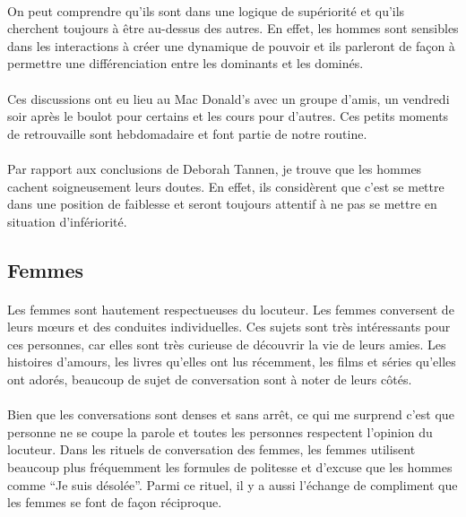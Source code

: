 \paragraph{} On peut comprendre qu'ils sont dans une logique de supériorité et
qu'ils cherchent toujours à être au-dessus des autres. En effet, les hommes
sont sensibles dans les interactions à créer une dynamique de pouvoir et ils
parleront de façon à permettre une différenciation entre les dominants et les
dominés.

\paragraph{} Ces discussions ont eu lieu au Mac Donald's avec un groupe d'amis,
un vendredi soir après le boulot pour certains et les cours pour d'autres. Ces
petits moments de retrouvaille sont hebdomadaire et font partie de notre
routine.

\paragraph{} Par rapport aux conclusions de Deborah Tannen, je trouve que les
hommes cachent soigneusement leurs doutes. En effet, ils considèrent que c'est
se mettre dans une position de faiblesse et seront toujours attentif à ne pas
se mettre en situation d'infériorité.

\subsection{Femmes}

\paragraph{} Les femmes sont hautement respectueuses du locuteur. Les femmes
conversent de leurs mœurs et des conduites individuelles.  Ces sujets sont
très intéressants pour ces personnes, car elles sont très curieuse de découvrir
la vie de leurs amies. Les histoires d'amours, les livres qu'elles ont lus
récemment, les films et séries qu'elles ont adorés, beaucoup de sujet de
conversation sont à noter de leurs côtés.

\paragraph{} Bien que les conversations sont denses et sans arrêt, ce qui me
surprend c'est que personne ne se coupe la parole et toutes les personnes
respectent l'opinion du locuteur. Dans les rituels de conversation des femmes,
les femmes utilisent beaucoup plus fréquemment les formules de politesse et
d'excuse que les hommes comme ``Je suis désolée''. Parmi ce rituel, il y a
aussi l'échange de compliment que les femmes se font de façon réciproque.

